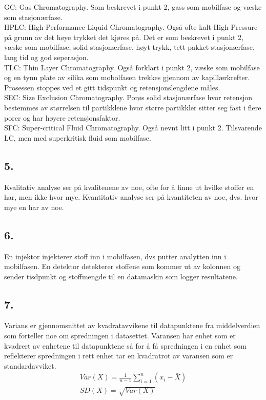 GC: Gas Chromatography. Som beskrevet i punkt 2, gass som mobilfase og væske som stasjonærfase.
\\
HPLC: High Performance Liquid Chromatography. Også ofte kalt High Pressure på grunn av det høye trykket det kjøres på. Det er som beskrevet i punkt 2, væske som mobilfase, solid stasjonærfase, høyt trykk, tett pakket stasjonærfase, lang tid og god seperasjon.
\\
TLC: Thin Layer Chromatography. Også forklart i punkt 2, væske som mobilfase og en tynn plate av silika som mobolfasen trekkes gjennom av kapillærkrefter. Prosessen stoppes ved et gitt tidspunkt og retensjonslengdene måles.
\\
SEC: Size Exclusion Chromatography. Porøs solid stasjonærfase hvor retensjon bestemmes av størrelsen til partikklene hvor større partikkler sitter seg fast i flere porer og har høyere retensjonsfaktor.
\\
SFC: Super-critical Fluid Chromatography. Også nevnt litt i punkt 2. Tilsvarende LC, men med superkritisk fluid som mobilfase.


\subsection*{5.}

Kvalitativ analyse ser på kvalitenene av noe, ofte for å finne ut hvilke stoffer en har, men ikke hvor mye.
Kvantitativ analyse ser på kvantiteten av noe, dvs. hvor mye en har av noe.


\subsection*{6.}

En injektor injekterer stoff inn i mobilfasen, dvs putter analytten inn i mobilfasen. En detektor detekterer stoffene som kommer ut av kolonnen og sender tisdpunkt og stoffmengde til en datamaskin som logger resultatene.


\subsection*{7.}

Varians er gjennomsnittet av kvadratavvikene til datapunktene fra middelverdien som forteller noe om spredningen i datasettet. Varansen har enhet som er kvadrert av enhetene til datapunktene så for å få spredningen i en enhet som reflekterer spredningen i rett enhet tar en kvadratrot av varansen som er standardavviket.
\begin{gather*}
	Var(X) = \frac{1}{n - 1} \sum_{i = 1}^n{\left(x_i - \bar{X}\right)}
	\\
	SD(X) = \sqrt{Var(X)}
\end{gather*}


